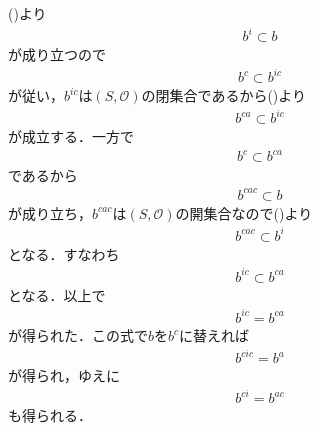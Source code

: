 	\begin{prf}
		()より
		\begin{align}
			b^i \subset b
		\end{align}
		が成り立つので
		\begin{align}
			b^c \subset b^{ic}
		\end{align}
		が従い，$b^{ic}$は$(S,\mathscr{O})$の閉集合であるから()より
		\begin{align}
			b^{ca} \subset b^{ic} 
		\end{align}
		が成立する．一方で
		\begin{align}
			b^c \subset b^{ca}
		\end{align}
		であるから
		\begin{align}
			b^{cac} \subset b
		\end{align}
		が成り立ち，$b^{cac}$は$(S,\mathscr{O})$の開集合なので()より
		\begin{align}
			b^{cac} \subset b^i
		\end{align}
		となる．すなわち
		\begin{align}
			b^{ic} \subset b^{ca}
		\end{align}
		となる．以上で
		\begin{align}
			b^{ic} = b^{ca}
		\end{align}
		が得られた．この式で$b$を$b^c$に替えれば
		\begin{align}
			b^{cic} = b^a
		\end{align}
		が得られ，ゆえに
		\begin{align}
			b^{ci} = b^{ac}
		\end{align}
		も得られる．
		\QED
	\end{prf}